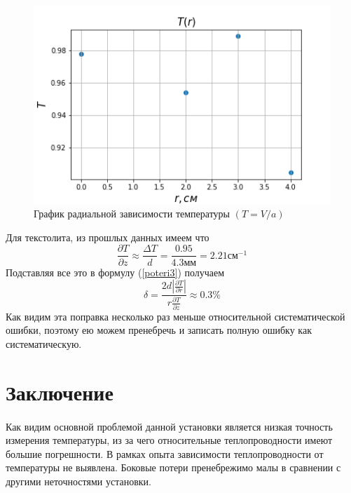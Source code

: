 \documentclass[a4paper, 12pt]{article}
\begin{document}
    \begin{figure}[h]
        \begin{center}
            \includegraphics[width=\linewidth]{T_r}
        \end{center}
        \caption{График радиальной зависимости температуры $(T=V/a)$}
    \end{figure}

    Для текстолита, из прошлых данных имеем что
    \begin{equation}
        \frac{\partial T}{\partial z} \approx \frac{\Delta T}{d} = \frac{0.95}{4.3мм} = 2.21 см^{-1}
    \end{equation}
    Подставляя все это в формулу (\ref{poteri3}) получаем
    \begin{equation}\label{poteri4}
        \delta = \frac{2d |\frac{\partial T}{\partial r}|}{r \frac{\partial T}{\partial z}} \approx 0.3\%
    \end{equation}
    Как видим эта поправка несколько раз меньше относительной систематической ошибки, поэтому ею можем пренебречь и записать полную ошибку как систематическую.

    \section{Заключение}
    \paragraph{}
    Как видим основной проблемой данной установки является низкая точность измерения температуры, из за чего относительные теплопроводности имеют большие погрешности. В рамках опыта зависимости теплопроводности от температуры не выявлена. Боковые потери пренебрежимо малы в сравнении с другими неточностями установки.
\end{document}
